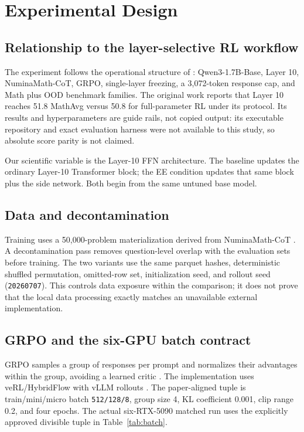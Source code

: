 \documentclass[10pt]{article}
\begin{document}
\section{Experimental Design}

\subsection{Relationship to the layer-selective RL workflow}
\label{sec:layer-selective-workflow}

The experiment follows the operational structure of
\citet{zhang2026onelayer}: Qwen3-1.7B-Base, Layer 10, NuminaMath-CoT, GRPO,
single-layer freezing, a 3,072-token response cap, and Math plus OOD benchmark
families.  The original work reports that Layer 10 reaches 51.8 MathAvg versus
50.8 for full-parameter RL under its protocol.  Its results and hyperparameters
are guide rails, not copied output: its executable repository and exact
evaluation harness were not available to this study, so absolute score parity
is not claimed.

Our scientific variable is the Layer-10 FFN architecture.  The baseline updates
the ordinary Layer-10 Transformer block; the EE condition updates that same
block plus the side network.  Both begin from the same untuned base model.

\subsection{Data and decontamination}

Training uses a 50,000-problem materialization derived from NuminaMath-CoT
\citep{numina2024}.  A decontamination pass removes question-level overlap with
the evaluation sets before training.  The two variants use the same parquet
hashes, deterministic shuffled permutation, omitted-row set, initialization
seed, and rollout seed (\texttt{20260707}).  This controls data exposure within
the comparison; it does not prove that the local data processing exactly
matches an unavailable external implementation.

\subsection{GRPO and the six-GPU batch contract}

GRPO samples a group of responses per prompt and normalizes their advantages
within the group, avoiding a learned critic \citep{shao2024deepseekmath}.  The
implementation uses veRL/HybridFlow \citep{sheng2025hybridflow} with vLLM
rollouts \citep{kwon2023vllm}.  The paper-aligned tuple is train/mini/micro
batch \texttt{512/128/8}, group size 4, KL coefficient 0.001, clip range 0.2,
and four epochs.  The actual six-RTX-5090 matched run uses the explicitly
approved divisible tuple in Table~\ref{tab:batch}.
\end{document}
